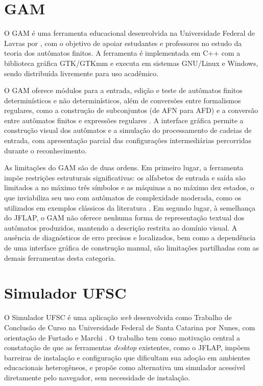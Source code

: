 \documentclass[
    12pt
    ,oneside
    ,a4paper
    ,chapter=TITLE
    ,section=TITLE
    ,sumario=abnt-6027-2012]{abntex2}
\begin{document}
\section{GAM}
\label{sec:rel-gam}

O GAM é uma ferramenta educacional desenvolvida
na Universidade Federal de Lavras por , com
o objetivo de apoiar estudantes e professores no estudo da teoria dos autômatos finitos. A
ferramenta é implementada em C++ com a biblioteca gráfica GTK/GTKmm e executa em sistemas
GNU/Linux e Windows, sendo distribuída livremente para uso acadêmico.

O GAM oferece módulos para a entrada, edição e teste de autômatos finitos determinísticos e
não determinísticos, além de conversões entre formalismos regulares, como a construção de
subconjuntos (de AFN para AFD) e a conversão entre autômatos finitos e expressões regulares
\cite{jukemura2005gam}. A interface gráfica permite a construção visual dos
autômatos e a simulação do processamento de cadeias de entrada, com apresentação parcial das
configurações intermediárias percorridas durante o reconhecimento.

As limitações do GAM são de duas ordens. Em primeiro lugar, a ferramenta impõe restrições
estruturais significativas: os alfabetos de entrada e saída são limitados a no máximo três
símbolos e as máquinas a no máximo dez estados, o que inviabiliza seu uso com autômatos de
complexidade moderada, como os utilizados em exemplos clássicos da literatura
\cite{jukemura2005gam}. Em segundo lugar, à semelhança do JFLAP, o GAM não oferece nenhuma
forma de representação textual dos autômatos produzidos, mantendo a descrição restrita ao
domínio visual. A ausência de diagnósticos de erro precisos e localizados, bem como a
dependência de uma interface gráfica de construção manual, são limitações partilhadas com as
demais ferramentas desta categoria.

\section{Simulador UFSC}
\label{sec:rel-ufsc}

O Simulador UFSC é uma aplicação \textit{web} desenvolvida como Trabalho de Conclusão de Curso
na Universidade Federal de Santa Catarina por Nunes, com orientação de Furtado e Marchi
\cite{nunes2017simulador}. O trabalho tem como motivação central a constatação de que as
ferramentas \textit{desktop} existentes, como o JFLAP, impõem barreiras de instalação e
configuração que dificultam sua adoção em ambientes educacionais heterogêneos, e propõe como
alternativa um simulador acessível diretamente pelo navegador, sem necessidade de instalação.
\end{document}
